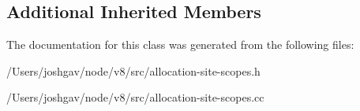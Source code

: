 \subsection*{Additional Inherited Members}


The documentation for this class was generated from the following files\+:\begin{DoxyCompactItemize}
\item 
/\+Users/joshgav/node/v8/src/allocation-\/site-\/scopes.\+h\item 
/\+Users/joshgav/node/v8/src/allocation-\/site-\/scopes.\+cc\end{DoxyCompactItemize}
